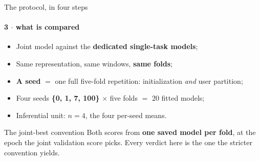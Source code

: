 \documentclass{beamer}
\begin{document}
\begin{frame}{The protocol, in four steps}
    \framesubtitle{3 $\cdot$ what is compared}

    \begin{itemize}
        \item Joint model against the \textbf{dedicated single-task models};
        \item Same representation, same windows, \textbf{same folds};
        \item \textbf{A seed} $=$ one full five-fold repetition: initialization \emph{and} user partition;
        \item Four seeds \textbf{\{0, 1, 7, 100\}} $\times$ five folds $=$ \alert{20 fitted models};
        \item Inferential unit: \alert{$n = 4$}, the four per-seed means.
    \end{itemize}

    \bigskip
    \begin{block}{The joint-best convention}
        \small
        Both scores from \textbf{one saved model per fold}, at the epoch the joint validation score picks.
        \alert{Every verdict here is the one the stricter convention yields.}
    \end{block}
\end{frame}
\end{document}
